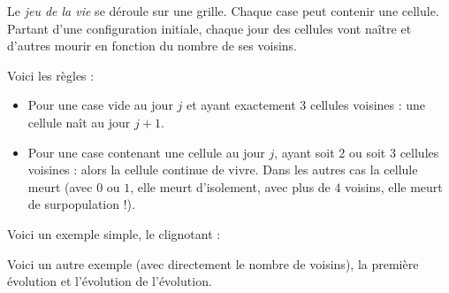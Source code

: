 \documentclass[11pt,class=report,crop=false]{standalone}
\begin{document}
\begin{cours}
Le \emph{jeu de la vie} se déroule sur une grille. Chaque case peut contenir une cellule. Partant d'une configuration initiale, chaque jour des cellules vont naître et d'autres mourir en fonction du nombre de ses voisins.

Voici les règles :
\begin{itemize}
  \item Pour une case vide au jour $j$ et ayant exactement $3$ cellules voisines : une cellule naît au jour $j+1$.


  \item Pour une case contenant une cellule au jour $j$, ayant soit $2$ ou soit $3$ cellules voisines : alors la cellule continue de vivre.
  Dans les autres cas la cellule meurt (avec $0$ ou $1$, elle meurt d'isolement, avec plus de $4$ voisins, elle meurt de surpopulation !).
  
  
\end{itemize}

Voici un exemple simple, le \og{}clignotant\fg{} :

 
Voici un autre exemple (avec directement le nombre de voisins), la première évolution et l'évolution de l'évolution.

\end{cours}



\end{document}
